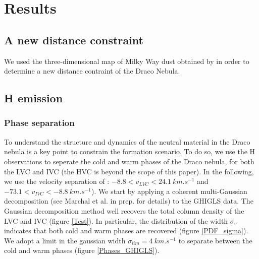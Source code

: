 \documentclass[traditabstract]{aa}
\begin{document}
\section{Results}
\label{sec:Res}
\subsection{A new distance constraint}
We used the three-dimensional map of Milky Way dust obtained by \cite{Green_2015ApJ...810...25G} in order to determine 
a new distance contraint of the Draco Nebula. 

   \subsection{H emission}
   \label{sec:HI-data}

      \subsubsection{Phase separation}

   To understand the structure and dynamics of the neutral material in the Draco nebula is a key point to constrain the formation scenario. To do so, we use the H observations to seperate the cold and warm phases of the Draco nebula, for both the LVC and IVC (the HVC is beyond the scope of this paper). In the following, we use the velocity separation of \cite{Planck_XXIV_2011}: $-8.8<v_{LVC}<24.1\: km.s^{-1}$ and $-73.1<v_{IVC}<-8.8\: km.s^{-1}$).
We start by applying a coherent multi-Gaussian decomposition (see Marchal et al. in prep. for details) to the GHIGLS data. The Gaussian decomposition method well recovers the total column density of the LVC and IVC (figure \ref{Test}). In particular, the distribution of the width $\sigma_v$ indicates that both cold and warm phases are recovered (figure \ref{PDF_sigma}). We adopt a limit in the gaussian width $\sigma_{lim}=4\: km.s^{-1}$ to separate between the
cold and warm phases (figure \ref{Phases_GHIGLS}).
\end{document}
